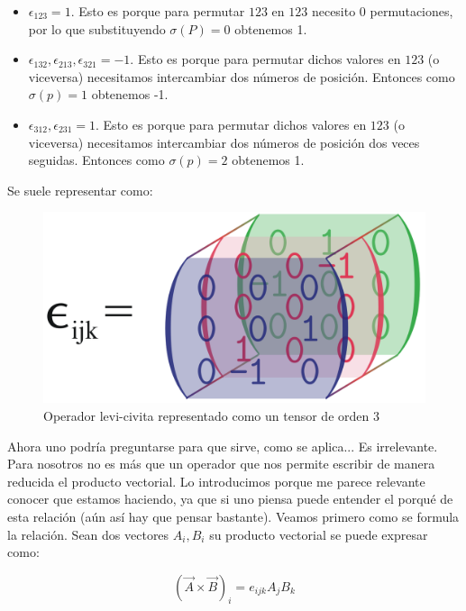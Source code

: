 \documentclass[12pt,a4paper]{book}
\begin{document}
\begin{itemize}
\item $\epsilon_{123} = 1$. Esto es porque para permutar $123$ en $123$ necesito 0 permutaciones, por lo que substituyendo $\sigma(P) = 0$ obtenemos 1.

\item $\epsilon_{132}, \epsilon_{213}, \epsilon_{321} = -1$. Esto es porque para permutar dichos valores en $123$ (o viceversa) necesitamos intercambiar dos números de posición. Entonces como $\sigma(p) = 1$ obtenemos -1.


\item $\epsilon_{312}, \epsilon_{231} = 1$. Esto es porque para permutar dichos valores en $123$ (o viceversa) necesitamos intercambiar dos números de posición dos veces seguidas. Entonces como $\sigma(p) = 2$ obtenemos 1.
\end{itemize}

Se suele representar como: 

\begin{figure}[h!] \centering
\includegraphics[scale=0.15]{levicivita.png}
\caption{Operador levi-civita representado como un tensor de orden 3}
\end{figure}

Ahora uno podría preguntarse para que sirve, como se aplica... Es irrelevante. Para nosotros no es más que un operador que nos permite escribir de manera reducida el producto vectorial. Lo introducimos porque me parece relevante conocer que estamos haciendo, ya que si uno piensa puede entender el porqué de esta relación (aún así hay que pensar bastante). Veamos primero como se formula la relación. Sean  dos vectores $A_i,B_i$ su producto vectorial se puede expresar como:

\begin{equation}
(\vec{A} \times \vec{B})_i = e_{ijk} A_j B_k
\end{equation}
\end{document}
